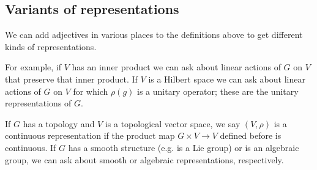 \documentclass[11pt,leqno]{article}
\theoremstyle{plain}
\theoremstyle{definition}
\numberwithin{equation}{section}
\numberwithin{lem}{section}
\begin{document}
\subsection{Variants of representations}
We can add adjectives in various places to the definitions above to get different kinds of representations. 

For example, if $V$ has an inner product we can ask about linear actions of $G$ on $V$ that preserve that inner product. If $V$ is a Hilbert space we can ask about linear actions of $G$ on $V$ for which $\rho(g)$ is a unitary operator; these are the unitary representations of $G$.

If $G$ has a topology and $V$ is a topological vector space, we say $(V,\rho)$ is a continuous representation if the product map $G\times V\to V$ defined before is continuous. If $G$ has a smooth structure (e.g. is a Lie group) or is an algebraic group, we can ask about smooth or algebraic representations, respectively.
\end{document}
